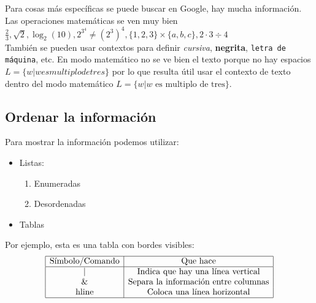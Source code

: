\documentclass[12pt]{article}
\begin{document}
Para cosas más específicas se puede buscar en Google, hay mucha información. Las operaciones matemáticas se ven muy bien $\frac{2}{3}, \sqrt{2}, \log_{2}(10), 2^{3^{4}} \neq (2^{3})^{4}, \{1, 2, 3\} \times \{a, b, c\}, 2 \cdot 3 \div 4$\\

También se pueden usar contextos para definir \textit{cursiva}, \textbf{negrita}, \texttt{letra de máquina}, etc. En modo matemático no se ve bien el texto porque no hay espacios $L = \{ w | w es multiplo de tres\}$ por lo que resulta útil usar el contexto de texto dentro del modo matemático $L = \{ w | w \text{ es multiplo de tres}\}$.

\subsection*{Ordenar la información}
Para mostrar la información podemos utilizar:
\begin{itemize}
		        \item Listas:
		        \begin{enumerate}
		            \item Enumeradas
		            \item Desordenadas
		        \end{enumerate}
		        \item Tablas
		    \end{itemize}

Por ejemplo, esta es una tabla con bordes visibles:
		    \[
		    \begin{array}{|c|c|}
		    \hline
		         \text{Símbolo/Comando} & \text{Que hace}  \\ \hline
		         \text{|} & \text{Indica que hay una línea vertical} \\
		         \text{\&} & \text{Separa la información entre columnas} \\
		         \text{hline} & \text{Coloca una línea horizontal} \\
		         \hline
		    \end{array}
		    \]
\newpage
\end{document}
